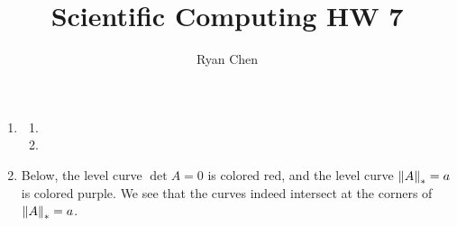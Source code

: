 \documentclass{article}
\title{Scientific Computing HW 7}
\author{Ryan Chen}
\begin{document}
	
\maketitle



\begin{enumerate}
	
	
	
	\item 
	
	\begin{enumerate}
		
		
		
		\item 
		
		
		
		\item
		
		
		
	\end{enumerate}
	
	
	
	\pagebreak
	
	
	
	\item Below, the level curve $\det A=0$ is colored red, and the level curve $\norm{A}_*=a$ is colored purple. We see that the curves indeed intersect at the corners of $\norm{A}_*=a$.
	

\end{enumerate}
\end{document}

